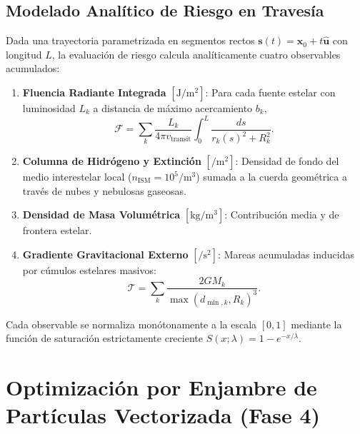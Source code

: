 \documentclass[11pt,a4paper]{article}
\begin{document}
\subsection{Modelado Analítico de Riesgo en Travesía}
Dada una trayectoria parametrizada en segmentos rectos $\mathbf{s}(t) = \mathbf{x}_0 + t \hat{\mathbf{u}}$ con longitud $L$, la evaluación de riesgo calcula analíticamente cuatro observables acumulados:
\begin{enumerate}
    \item \textbf{Fluencia Radiante Integrada} $[\si{\joule\per\meter\squared}]$: Para cada fuente estelar con luminosidad $L_k$ a distancia de máximo acercamiento $b_k$,
    \begin{equation}
        \mathcal{F} = \sum_k \frac{L_k}{4\pi v_{\text{transit}}} \int_0^L \frac{ds}{r_k(s)^2 + R_k^2}.
    \end{equation}
    \item \textbf{Columna de Hidrógeno y Extinción} $[\si{\per\meter\squared}]$: Densidad de fondo del medio interestelar local ($n_{\text{ISM}} = 10^5\si{\per\meter\cubed}$) sumada a la cuerda geométrica a través de nubes y nebulosas gaseosas.
    \item \textbf{Densidad de Masa Volumétrica} $[\si{\kilo\gram\per\meter\cubed}]$: Contribución media y de frontera estelar.
    \item \textbf{Gradiente Gravitacional Externo} $[\si{\per\second\squared}]$: Mareas acumuladas inducidas por cúmulos estelares masivos:
    \begin{equation}
        \mathcal{T} = \sum_k \frac{2 G M_k}{\max(d_{\min, k}, R_k)^3}.
    \end{equation}
\end{enumerate}
Cada observable se normaliza monótonamente a la escala $[0, 1]$ mediante la función de saturación estrictamente creciente $S(x; \lambda) = 1 - e^{-x/\lambda}$.

\section{Optimización por Enjambre de Partículas Vectorizada (Fase 4)}
\end{document}
